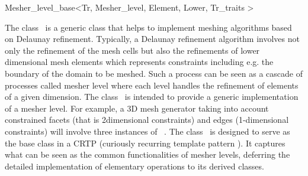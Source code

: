 

\begin{ccRefClass}{Mesher_level_base<Tr, Mesher_level, Element, Lower,
Tr_traits >}  %


\ccDefinition
  
The class \ccRefName\ is a generic class 
that helps to implement meshing algorithms 
based on Delaunay refinement.
Typically, a  Delaunay refinement algorithm
involves not only  the refinement of the mesh cells
but also the refinements of lower dimensional mesh elements
which represents  constraints including e.g.
the boundary of the domain to be meshed. 
Such a process can be seen
as a cascade of processes called mesher level  where each  level
handles the refinement of elements of a given dimension.
The class  \ccRefName\ is intended to provide a generic implementation
of a mesher level.
For example, a 3D mesh generator taking into account
constrained facets (that is 2dimensional constraints)
and edges (1-dimensional constraints) will involve
three  instances of \ccRefName\ .
The class \ccRefName\ 
is designed to serve as the base class
in a CRTP (curiously recurring template pattern ).
It captures what can be seen as the common functionalities
of mesher levels, deferring the  detailed implementation
of elementary operations to its derived classes.




\end{ccRefClass}
